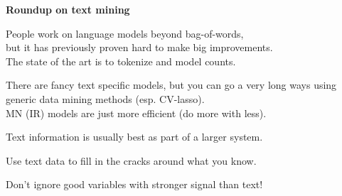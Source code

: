 \documentclass[11pt,xcolor=svgnames]{beamer}
\newcommand{\theme}{\color{Maroon}}
\newcommand{\bk}{\color{black}}
\newcommand{\gr}{\color{black!60}}
\newcommand{\nv}{\color{Navy}}
\newcommand{\sk}{\vspace{.5cm}}
\begin{document}



\begin{frame}

{\bf Roundup on \theme text mining}


\sk\bk
People work on language models beyond bag-of-words, \\but it
has previously  proven hard to make big improvements.\\
{\theme The state of the art is to tokenize and model counts.}

\sk
There are  fancy text specific models, but you can go a very long ways
using  generic data mining methods 
{\gr (esp. CV-lasso)}.  \\
MN (IR) models are just more efficient (do more with less).


\sk 
Text information is usually best as part of a larger system.

Use text data to fill in the cracks around what you know.

Don't ignore good variables with stronger signal than text!

\end{frame}
\end{document}
